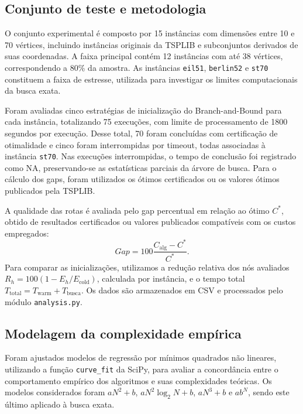 \subsection{Conjunto de teste e metodologia}

O conjunto experimental é composto por 15 instâncias com dimensões entre 10 e 70 vértices, incluindo instâncias originais da TSPLIB e subconjuntos derivados de suas coordenadas. A faixa principal contém 12 instâncias com até 38 vértices, correspondendo a 80\% da amostra. As instâncias \texttt{eil51}, \texttt{berlin52} e \texttt{st70} constituem a faixa de estresse, utilizada para investigar os limites computacionais da busca exata.

Foram avaliadas cinco estratégias de inicialização do Branch-and-Bound para cada instância, totalizando 75 execuções, com limite de processamento de 1800 segundos por execução. Desse total, 70 foram concluídas com certificação de otimalidade e cinco foram interrompidas por timeout, todas associadas à instância \texttt{st70}. Nas execuções interrompidas, o tempo de conclusão foi registrado como NA, preservando-se as estatísticas parciais da árvore de busca. Para o cálculo dos gaps, foram utilizados os ótimos certificados ou os valores ótimos publicados pela TSPLIB.

A qualidade das rotas é avaliada pelo gap percentual em relação ao ótimo $C^*$, obtido de resultados certificados ou valores publicados compatíveis com os custos empregados:
\begin{equation}
Gap=100\frac{C_{\mathrm{alg}}-C^*}{C^*}.
\end{equation}
Para comparar as inicializações, utilizamos a redução relativa dos nós avaliados $R_h=100(1-E_h/E_{\mathrm{cold}})$, calculada por instância, e o tempo total $T_{\mathrm{total}}=T_{\mathrm{warm}}+T_{\mathrm{busca}}$. Os dados são armazenados em CSV e processados pelo módulo \texttt{analysis.py}.

\subsection{Modelagem da complexidade empírica}

Foram ajustados modelos de regressão por mínimos quadrados não lineares, utilizando a função \texttt{curve\_fit} da SciPy, para avaliar a concordância entre o comportamento empírico dos algoritmos e suas complexidades teóricas. Os modelos considerados foram $aN^2+b$, $aN^2\log_2 N+b$, $aN^3+b$ e $ab^N$, sendo este último aplicado à busca exata.


